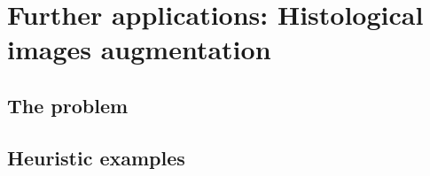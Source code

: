 
\section{Further applications: Histological images augmentation}

\subsection{The problem}

\subsection{Heuristic examples}

